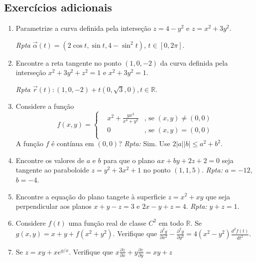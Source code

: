 \documentclass[11pt]{article}
\begin{document}
   \subsection{Exercícios adicionais}
     \begin{enumerate}
      \item Parametrize a curva definida pela interseção $z=4-y^{2}$ e 
      $z=x^{2}+3y^{2}$.
      
     {\it Rpta} $\overrightarrow{\alpha}(t)=(2 \cos t, \sin t, 4-\sin^{2}t)$, 
     $t \in [0,2\pi]$.
       \item Encontre a reta tangente no ponto $(1,0,-2)$ da curva definida pela interseção $x^{2}+3y^{2}+z^{2}=1$ e 
      $x^{2}+3y^{2}=1$.
      
       {\it Rpta} $\overrightarrow{r}(t): (1,0,-2)+t(0,\sqrt{3},0), t \in \mathbb{R}$.
     \item Considere a função 
     $$
    f(x,y)= \left\{  
            \begin{array}{lll}
    &x^{2}+\frac{yx^{3}}{x^{4}+y^2} &\text{, se } (x,y)\neq (0,0) \\
    & 0 &\text{, se } (x,y)=(0,0)  \\
            \end{array}
            \right. 
    $$      
    A função $f$ é contínua em $(0,0)$? {\it Rpta: } Sim.
    Use $2|a||b|\leq a^{2}+b^{2}$.
      \item Encontre os valores de $a$ e $b$ para que 
     o plano $ax+by+2z+2=0$ seja tangente ao paraboloide 
     $z=y^{2}+3x^{2}+1$  no ponto $(1,1,5)$.
     {\it Rpta: } $a=-12$, $b=-4$.   
     \item Encontre a equação do plano tangete à superficie 
     $z=x^{2}+xy$ que seja perpendicular aos planos 
     $x+y-z=3$ e  $2x-y+z=4$.
     {\it Rpta: } $y+z=1$.   
    
    \item Considere $f(t)$ uma função real de classe $C^{2}$ em todo 
       $\mathbb{R}$. Se $g(x,y)=x+y+f(x^{2}+y^{2})$. 
       Verifique que  $\frac{\partial^{2} g}{\partial x^{2}}-
       \frac{\partial^{2} g}{\partial y^{2}}=4(x^{2}-y^{2})
       \frac{d^{2} f(t)}{d t^{2}}$.
       \item Se $z=xy+xe^{y/x}$. Verifique que 
       $x\frac{\partial z}{\partial x}+
       y\frac{\partial z}{\partial y}=xy+z$
     
     \end{enumerate}
\end{document}
